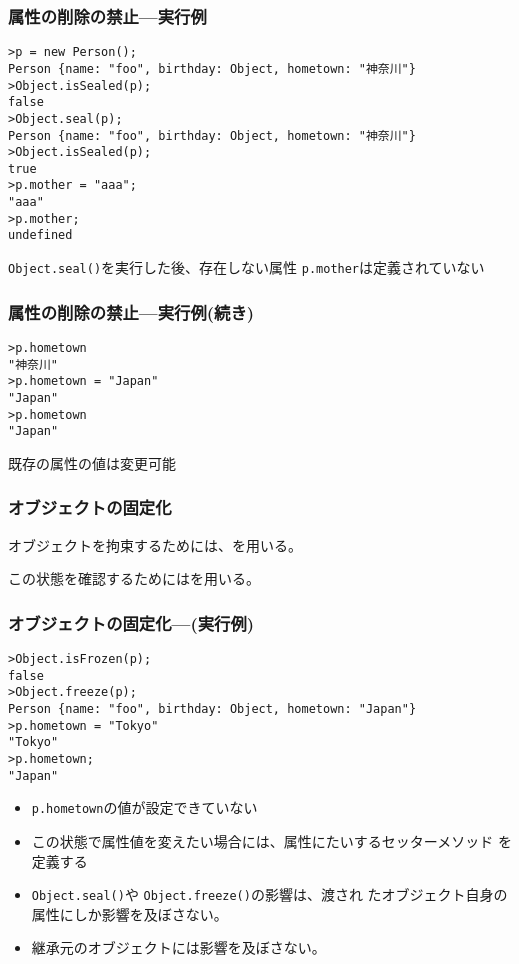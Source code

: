 \begin{frame}[containsverbatim]
 \frametitle{属性の削除の禁止---実行例}
\begin{Verbatim}
>p = new Person();
Person {name: "foo", birthday: Object, hometown: "神奈川"}
>Object.isSealed(p);
false
>Object.seal(p);
Person {name: "foo", birthday: Object, hometown: "神奈川"}
>Object.isSealed(p);
true
>p.mother = "aaa";
"aaa"
>p.mother;
undefined
\end{Verbatim}
\texttt{Object.seal()}を実行した後、存在しない属性
 \texttt{p.mother}は定義されていない
 \end{frame}
\begin{frame}[containsverbatim]
 \frametitle{属性の削除の禁止---実行例(続き)}
\begin{Verbatim}
>p.hometown
"神奈川"
>p.hometown = "Japan"
"Japan"
>p.hometown
"Japan"
\end{Verbatim}
 既存の属性の値は変更可能
\end{frame}
\begin{frame}[containsverbatim]
 \frametitle{オブジェクトの固定化}
 オブジェクトを拘束するためには、を用いる。

 この状態を確認するためにはを用いる。
\end{frame}
\begin{frame}[containsverbatim]
 \frametitle{オブジェクトの固定化---(実行例)}
\begin{Verbatim}
>Object.isFrozen(p);
false
>Object.freeze(p);
Person {name: "foo", birthday: Object, hometown: "Japan"}
>p.hometown = "Tokyo"
"Tokyo"
>p.hometown;
"Japan"
\end{Verbatim}
 \begin{itemize}
  \item  \texttt{p.hometown}の値が設定できていない
  \item この状態で属性値を変えたい場合には、属性にたいするセッターメソッド
 を定義する
  \item \texttt{Object.seal()}や \texttt{Object.freeze()}の影響は、渡され
 たオブジェクト自身の属性にしか影響を及ぼさない。
  \item 継承元のオブジェクトには影響を及ぼさない。
 \end{itemize}
 \end{frame}
